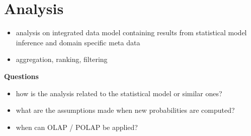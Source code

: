 \section{Analysis}

\begin{itemize}
\item analysis on integrated data model containing results from statistical model inference and domain specific meta data
\item aggregation, ranking, filtering
\end{itemize}

\textbf{Questions}
\begin{itemize}
\item how is the analysis related to the statistical model or similar ones?
\item what are the assumptions made when new probabilities are computed?
\item when can OLAP / POLAP be applied?
\end{itemize}